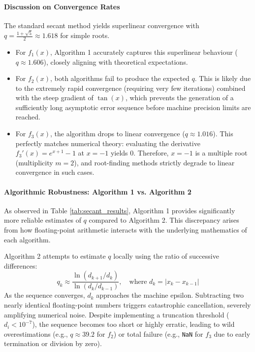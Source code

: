 \begin{solution}
	\paragraph{Discussion on Convergence Rates}
	The standard secant method yields superlinear convergence with $q = \frac{1
			+ \sqrt{5}}{2} \approx 1.618$ for simple roots.
	\begin{itemize}
		\item For $f_1(x)$, Algorithm 1 accurately captures this superlinear
		      behaviour ($q \approx 1.606$), closely aligning with theoretical
		      expectations.
		\item For $f_2(x)$, both algorithms fail to produce the expected $q$.
		      This is likely due to the extremely rapid convergence (requiring very
		      few iterations) combined with the steep gradient of $\tan(x)$, which
		      prevents the generation of a sufficiently long asymptotic error sequence
		      before machine precision limits are reached.
		\item For $f_3(x)$, the algorithm drops to linear convergence ($q
			      \approx 1.016$). This perfectly matches numerical theory: evaluating the
		      derivative $f_3'(x) = e^{x+1} - 1$ at $x = -1$ yields $0$. Therefore, $x
			      = -1$ is a multiple root (multiplicity $m=2$), and root-finding
		      methods strictly degrade to linear convergence in such cases.
	\end{itemize}

	\paragraph{Algorithmic Robustness: Algorithm 1 vs. Algorithm 2}
	As observed in Table \ref{tab:secant_results}, Algorithm 1 provides
	significantly more reliable estimates of $q$ compared to Algorithm 2. This
	discrepancy arises from how floating-point arithmetic interacts with the
	underlying mathematics of each algorithm.

	Algorithm 2 attempts to estimate $q$ locally using the ratio of successive differences:
	\[
		q_k \approx \frac{\ln(d_{k+1} / d_k)}{\ln(d_k / d_{k-1})}, \quad \text{where } d_k = |x_k - x_{k-1}|
	\]
	As the sequence converges, $d_k$ approaches the machine epsilon.
	Subtracting two nearly identical floating-point numbers triggers
	catastrophic cancellation, severely amplifying numerical noise.
	Despite implementing a truncation threshold ($d_i < 10^{-7}$), the sequence
	becomes too short or highly erratic, leading to wild overestimations (e.g.,
	$q \approx 39.2$ for $f_2$) or total failure (e.g., \texttt{NaN} for $f_3$
	due to early termination or division by zero).


\end{solution}
